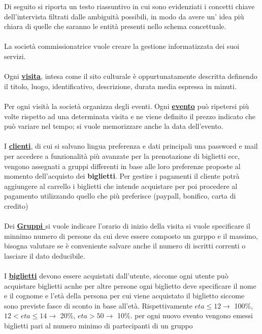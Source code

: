 \documentclass[a4paper,12pt]{report}
\begin{document}
Di seguito si riporta un testo riassuntivo in cui sono evidenziati i concetti chiave
dell’intervista filtrati dalle ambiguità possibili, in modo da avere un’ idea più chiara di
quelle che saranno le entità presenti nello schema concettuale.\\\\
La società commissionatrice vuole creare la gestione informatizzata dei suoi servizi.\\\\
Ogni \textbf{\underline{visita}}, intesa come il sito culturale è oppurtunatamente descritta definendo 
il titolo, luogo, identificativo, descrizione, durata media espressa in minuti.\\\\ 
Per ogni visità la società organizza degli eventi. Ogni \textbf{\underline{evento}} può ripetersi più volte 
rispetto ad una determinata visita e ne viene definito il prezzo indicato che può variare nel tempo; si vuole memorizzare anche 
la data dell'evento.
\\\\
I \textbf{\underline{clienti}}, di cui si salvano lingua preferenza e dati principali una password e mail per accedere a funzionalità
più avanzate per la prenotazione di biglietti ecc, vengono assegnati a gruppi differenti in base alle loro preferenze 
proposte  al momento dell'acquisto dei \textbf{biglietti}. Per gestire i pagamenti il cliente potrà aggiungere al carrello i biglietti che intende
acquistare per poi procedere al pagamento utilizzando quello che più preferisce (paypall, bonifico, carta di credito) \\\\
Dei \textbf{\underline{Gruppi
}} si vuole indicare l'orario di inizio della visita si vuole specificare 
il minnimo numero di persone da cui deve essere composto un gurppo e il massimo, bisogna valutare
se è conveniente salvare anche il numero di iscritti correnti o lasciare il dato deducibile.\\\\
I \textbf{\underline{biglietti}} devono essere acquistati dall'utente, siccome ogni utente può acquistare biglietti acnhe per altre persone 
ogni biglietto deve specificare il nome e il cognome e l'età della persona per cui 
viene acquistato il biglietto siccome sono previste fasce di sconto in base all'età.
Rispettivamente \(eta \le 12 \rightarrow\)  100\%, \(12 < eta \le 14 \rightarrow\)  20\%, \(eta >50 \rightarrow\)  10\%.
per ogni nuovo evento vengono emessi biglietti pari al numero minimo di partecipanti di un gruppo\\\\
\end{document}
